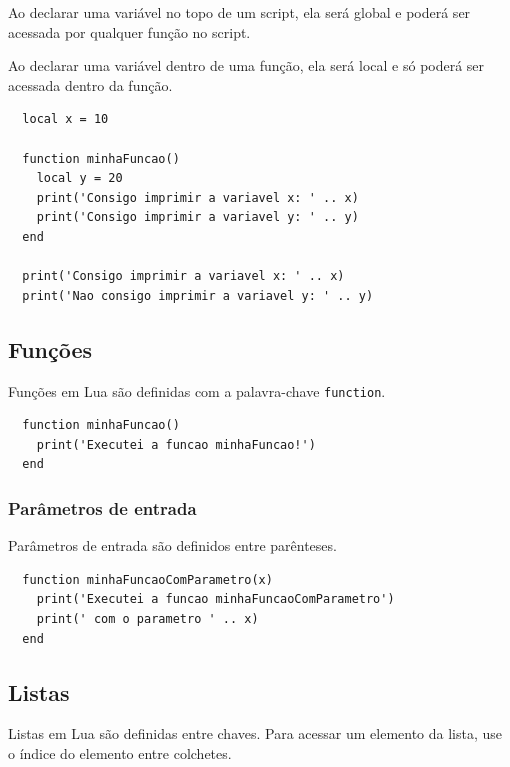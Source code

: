 \documentclass{article}
\begin{document}
Ao declarar uma variável no topo de um script, ela será global e poderá ser acessada por qualquer função no script.

Ao declarar uma variável dentro de uma função, ela será local e só poderá ser acessada dentro da função.

\begin{center}
  \begin{lstlisting}
  local x = 10

  function minhaFuncao()
    local y = 20
    print('Consigo imprimir a variavel x: ' .. x)
    print('Consigo imprimir a variavel y: ' .. y)
  end

  print('Consigo imprimir a variavel x: ' .. x)
  print('Nao consigo imprimir a variavel y: ' .. y)
  \end{lstlisting}
\end{center}

\subsection{Funções}

Funções em Lua são definidas com a palavra-chave \texttt{function}.

\begin{center}
  \begin{lstlisting}
  function minhaFuncao()
    print('Executei a funcao minhaFuncao!')
  end
  \end{lstlisting}
\end{center}

\subsubsection{Parâmetros de entrada}

Parâmetros de entrada são definidos entre parênteses.

\begin{center}
  \begin{lstlisting}
  function minhaFuncaoComParametro(x)
    print('Executei a funcao minhaFuncaoComParametro')
    print(' com o parametro ' .. x)
  end
  \end{lstlisting}
\end{center}

\subsection{Listas}

Listas em Lua são definidas entre chaves.
Para acessar um elemento da lista, use o índice do elemento entre colchetes.
\end{document}

